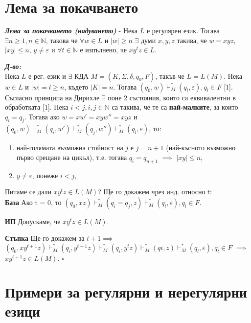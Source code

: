 \documentclass[fleqn,12pt]{article}
\begin{document}
\begin{flushleft}
\section{Лема за покачването}

\textit{\textbf{Лема за покачването (надуването)}} - Нека $L$ е регулярен език. Тогава $\exists n \geq 1, n \in \mathbb{N}$, такова че $\forall w \in L$ и $|w| \geq n$ $\exists$ думи $x, y, z$ такива, че $w = xyz$, $|xy| \leq n$, $y \neq \varepsilon$ и $\forall t \in \mathbb{N}$ е изпълнено, че $xy^tz \in L$.

\textit{\textbf{Д-во:}}\\
Нека $L$ е рег. език и $\exists$ КДА $M = (K, \Sigma, \delta, q_0, F)$, такъв че $L = L(M)$. Нека $w \in L$ и $|w| = l \geq n$, където $|K| = n$. Тогава $(q_0, w) \vdash_M^* (q_l, \varepsilon), q_l \in F$ [1]. \\
Съгласно принципа на Дирихле $\exists$ поне 2 състояния, които са еквивалентни в обработката [1]. Нека $i < j, i,j \in \mathbb{N}$ са такива, че те са \textbf{най-малките}, за които $q_i = q_j$. Тогава ако $w = xw' = xyw'' = xyz$ и $(q_0, w) \vdash_M^* (q_i, w') \vdash_M^* (q_j, w'') \vdash_M^* (q_l, \varepsilon)$, то:
\begin{enumerate}
    \item най-голямата възможна стойност на $j$ е $j=n+1$ (най-късното възможно първо срещане на цикъл), т.е. тогава $q_i = q_{n+1}$ $\implies$ $|xy| \leq n$,
    \item $y \neq \varepsilon$, понеже $i < j$,
\end{enumerate}

Питаме се дали $xy^tz \in L(M)$? Ще го докажем чрез инд. относно $t$: \\

\textbf{База} Ако t = 0, то $(q_0, xz) \vdash_M^* (q_i = q_j, z) \vdash_M^* (q_l, \varepsilon), q_l \in F$.

\textbf{ИП} Допускаме, че $xy^tz \in L(M)$.

\textbf{Стъпка} Ще го докажем за $t+1 \implies$ \\

$(q_0, xy^{t+1}z) \vdash_M^* (q_i, y^{t+1}z) \vdash_M^* (q_i, y^tz) \vdash_M^* (qi, z) \vdash_M^* (q_l, \varepsilon), q_l \in F$ $\implies$ $xy^{t+1}z \in L(M)$. $\square$

\section{Примери за регулярни и нерегулярни езици}


\end{flushleft}
\end{document}
